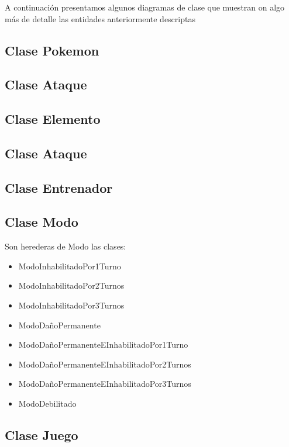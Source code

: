 A continuación presentamos algunos diagramas de clase que muestran on algo más de
detalle las entidades anteriormente descriptas

\subsection{Clase Pokemon}
  \def\scale{.6}
  \def\path{Pokemon.png}
  \def\text{Pokemon}
  

\subsection{Clase Ataque}
  \def\scale{.6}
  \def\path{Ataque.png}
  \def\text{Ataque}
  

\subsection{Clase Elemento}
  \def\scale{.6}
  \def\path{Elemento.png}
  \def\text{Elemento}
  

\subsection{Clase Ataque}
  \def\scale{.6}
  \def\path{Ataque.png}
  \def\text{Ataque}
  

\subsection{Clase Entrenador}
  \def\scale{.6}
  \def\path{Entrenador.png}
  \def\text{Entrenador}
  

\subsection{Clase Modo}
  \def\scale{.6}
  \def\path{Modo.png}
  \def\text{Modo}
  
  Son herederas de Modo las clases:
  \begin{itemize}
    \item ModoInhabilitadoPor1Turno
    \item ModoInhabilitadoPor2Turnos
    \item ModoInhabilitadoPor3Turnos
    \item ModoDañoPermanente
    \item ModoDañoPermanenteEInhabilitadoPor1Turno
    \item ModoDañoPermanenteEInhabilitadoPor2Turnos
    \item ModoDañoPermanenteEInhabilitadoPor3Turnos
    \item ModoDebilitado
  \end{itemize}

\subsection{Clase Juego}
  \def\scale{.6}
  \def\path{Juego.png}
  \def\text{Juego}
  